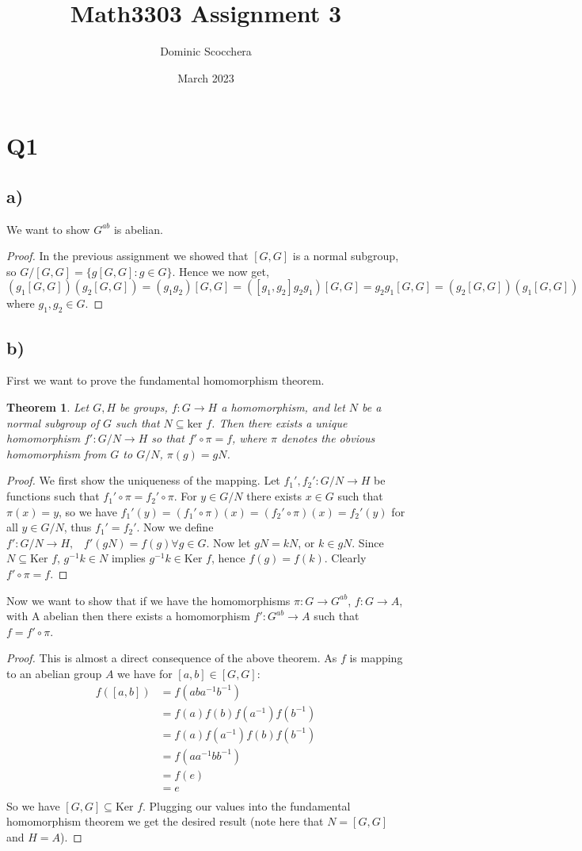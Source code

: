 \documentclass{article}
\title{Math3303 Assignment 3}
\author{Dominic Scocchera}
\date{March 2023}
\newtheorem{theorem}{Theorem}
\begin{document}
\maketitle
\section*{Q1}
\subsection*{a)}
We want to show $G^{ab}$ is abelian.
\begin{proof}
In the previous assignment we showed that $[G,G]$ is a normal subgroup, so $G/[G,G]=\{g[G,G]:g\in G\}$. Hence we now get, $(g_1[G,G])(g_2[G,G])=(g_1 g_2)[G,G]=([g_1,g_2]g_2g_1)[G,G]=g_2g_1[G,G]=(g_2[G,G])(g_1[G,G])$ where $g_1,g_2\in G$.
\end{proof}
\subsection*{b)}
First we want to prove the fundamental homomorphism theorem.
\begin{theorem}
Let $G,H$ be groups, $f:G\rightarrow H$ a homomorphism, and let $N$ be a normal subgroup of $G$ such that $N\subseteq\text{ker }f$. Then there exists a unique homomorphism $f':G/N\rightarrow H$ so that $f'\circ\pi=f$, where $\pi$ denotes the obvious homomorphism from $G$ to $G/N$, $\pi(g)=gN$.
\end{theorem}
\begin{proof}
We first show the uniqueness of the mapping. Let $f_1',f_2':G/N\rightarrow H$ be functions such that $f_1'\circ\pi=f_2'\circ\pi$. For $y\in G/N$ there exists $x\in G$ such that $\pi(x)=y$, so we have $f_1'(y)=(f_1'\circ\pi)(x)=(f_2'\circ\pi)(x)=f_2'(y)$ for all $y\in G/N$, thus $f_1'=f_2'$. Now we define $f':G/N\rightarrow H,\;\;\;f'(gN)=f(g)\forall g\in G$. Now let $gN=kN$, or $k\in gN$. Since $N\subseteq \text{Ker }f$, $g^{-1}k\in N$ implies $g^{-1}k\in \text{Ker }f$, hence $f(g)=f(k)$. Clearly $f'\circ\pi=f$.
\end{proof}
\noindent Now we want to show that if we have the homomorphisms $\pi:G\rightarrow G^{ab}$, $f:G\rightarrow A$, with A abelian then there exists a homomorphism $f':G^{ab}\rightarrow A$ such that $f=f'\circ\pi$.
\begin{proof}
This is almost a direct consequence of the above theorem. As $f$ is mapping to an abelian group $A$ we have for $[a,b]\in[G,G]$:
\begin{align*}
f([a,b])&=f(aba^{-1}b^{-1})\\
&=f(a)f(b)f(a^{-1})f(b^{-1})\\
&=f(a)f(a^{-1})f(b)f(b^{-1})\\
&=f(aa^{-1}bb^{-1})\\
&=f(e)\\
&=e\\
\end{align*}
So we have $[G,G]\subseteq\text{Ker } f$. Plugging our values into the fundamental homomorphism theorem we get the desired result (note here that $N=[G,G]$ and $H=A$).
\end{proof}
\end{document}
